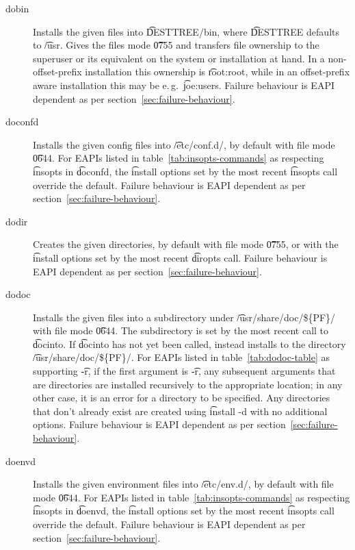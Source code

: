 \begin{description}
\item[dobin] Installs the given files into \t{DESTTREE/bin}, where \t{DESTTREE} defaults to
    \t{/usr}. Gives the files mode \t{0755} and transfers file ownership to the superuser or its
    equivalent on the system or installation at hand. In a non-offset-prefix installation this
    ownership is \t{root:root}, while in an offset-prefix aware installation this may be e.\,g.\
    \t{joe:users}. Failure behaviour is EAPI dependent as per section~\ref{sec:failure-behaviour}.

\item[doconfd] Installs the given config files into \t{/etc/conf.d/}, by default with file mode
    \t{0644}. For EAPIs listed in table~\ref{tab:insopts-commands} as respecting \t{insopts}
    in \t{doconfd}, the \t{install} options set by the most recent \t{insopts} call override
    the default. Failure behaviour is EAPI dependent as per section~\ref{sec:failure-behaviour}.

\item[dodir] Creates the given directories, by default with file mode \t{0755}, or with the
    \t{install} options set by the most recent \t{diropts} call. Failure behaviour is EAPI
    dependent as per section~\ref{sec:failure-behaviour}.

\item[dodoc]  Installs the given files into a subdirectory under
    \t{/usr/share/doc/\$\{PF\}/} with file mode \t{0644}. The subdirectory is set by the most
    recent call to \t{docinto}. If \t{docinto} has not yet been called, instead installs to the
    directory \t{/usr/share/doc/\$\{PF\}/}. For EAPIs listed in table~\ref{tab:dodoc-table}
    as supporting \t{-r}, if the first argument is \t{-r}, any subsequent arguments that are
    directories are installed recursively to the appropriate location; in any other case, it is
    an error for a directory to be specified. Any directories that don't already exist are created
    using \t{install -d} with no additional options. Failure behaviour is EAPI dependent as per
    section~\ref{sec:failure-behaviour}.

\item[doenvd] Installs the given environment files into \t{/etc/env.d/}, by default with file mode
    \t{0644}. For EAPIs listed in table~\ref{tab:insopts-commands} as respecting \t{insopts}
    in \t{doenvd}, the \t{install} options set by the most recent \t{insopts} call override
    the default. Failure behaviour is EAPI dependent as per section~\ref{sec:failure-behaviour}.


\end{description}
